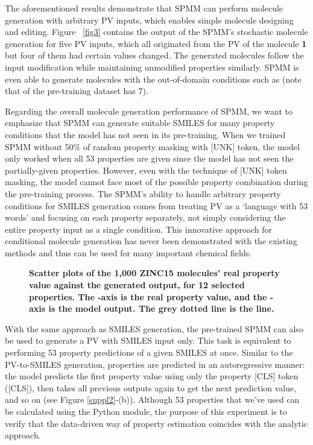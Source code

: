 \documentclass{nature_meth}
\newcommand{\1}{\blmath{1}}
\newcommand{\0}{\blmath{0}}
\begin{document}
The aforementioned results demonstrate that SPMM can perform molecule generation with arbitrary PV inputs, which enables simple molecule designing and editing. Figure ~\ref{fig3} contains the output of the SPMM's stochastic molecule generation for five PV inputs, which all originated from the PV of the molecule \textbf{1} but four of them had certain values changed. The generated molecules follow the input modification while maintaining unmodified properties similarly. SPMM is even able to generate molecules with the out-of-domain conditions such as \emph{} (note that  of the pre-training dataset has 7).

Regarding the overall molecule generation performance of SPMM, we want to emphasize that SPMM can generate suitable SMILES for many property conditions that the model has not seen in its pre-training. When we trained SPMM without 50\% of random property masking with [UNK] token, the model only worked when all 53 properties are given since the model has not seen the partially-given properties. However, even with the technique of [UNK] token masking, the model cannot face most of the  possible property combination during the pre-training process. The SPMM's ability to handle arbitrary property conditions for SMILES generation comes from treating PV as a `language with 53 words' and focusing on each property separately, not simply considering the entire property input as a single condition. This innovative approach for conditional molecule generation has never been demonstrated with the existing methods and thus can be used for many important chemical fields. 

\begin{figure}[!t]
	\centering
 \centerline{}
 \vspace*{-0.5cm}
	\caption{\bf\footnotesize 
Scatter plots of the 1,000 ZINC15 molecules' real property value against the generated output, for 12 selected properties. The -axis is the real property value, and the -axis is the model output. The grey dotted line is the  line.}
	\label{fig2}
\end{figure}
With the same approach as SMILES generation, the pre-trained SPMM can also be used to generate a PV with SMILES input only. 
This task is equivalent to performing 53 property predictions of a given SMILES at once. 
Similar to the PV-to-SMILES generation, properties are predicted in an autoregressive manner: the model predicts the first property value using only the property [CLS] token ([CLS]), then takes all previous outputs again to get the next prediction value, and so on (see Figure \ref{suppl2}-(b)). Although 53 properties that we've used can be calculated using the Python module, the purpose of this experiment is to verify that the data-driven way of property estimation coincides with the analytic approach.
\end{document}
